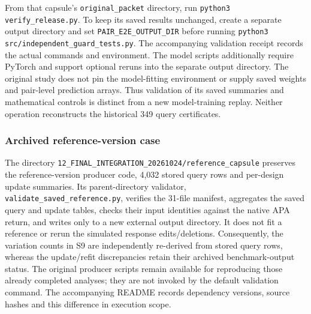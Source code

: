 \documentclass[11pt]{article}
\begin{document}
From that capsule's \texttt{original\_packet} directory, run \texttt{python3 verify\_release.py}. To keep its saved results unchanged, create a separate output directory and set \texttt{PAIR\_E2E\_OUTPUT\_DIR} before running \texttt{python3 src/independent\_guard\_tests.py}. The accompanying validation receipt records the actual commands and environment. The model scripts additionally require PyTorch and support optional reruns into the separate output directory. The original study does not pin the model-fitting environment or supply saved weights and pair-level prediction arrays. Thus validation of its saved summaries and mathematical controls is distinct from a new model-training replay. Neither operation reconstructs the historical 349 query certificates.


\subsubsection{Archived reference-version case}
The directory \nolinkurl{12_FINAL_INTEGRATION_20261024/reference_capsule} preserves the reference-version producer code, 4,032 stored query rows and per-design update summaries. Its parent-directory validator, \nolinkurl{validate_saved_reference.py}, verifies the 31-file manifest, aggregates the saved query and update tables, checks their input identities against the native APA return, and writes only to a new external output directory. It does not fit a reference or rerun the simulated response edits/deletions. Consequently, the variation counts in S9 are independently re-derived from stored query rows, whereas the update/refit discrepancies retain their archived benchmark-output status. The original producer scripts remain available for reproducing those already completed analyses; they are not invoked by the default validation command. The accompanying README records dependency versions, source hashes and this difference in execution scope.
\end{document}
